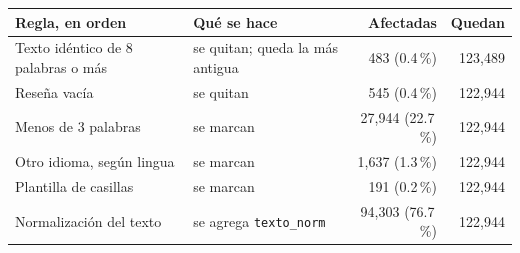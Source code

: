\begin{tabularx}{\textwidth}{>{\raggedright\arraybackslash}X >{\raggedright\arraybackslash}p{4.4cm} rr}
\toprule
Regla, en orden & Qué se hace & Afectadas & Quedan \\
\midrule
Texto idéntico de 8 palabras o más & se quitan; queda la más antigua & 483 (0.4\,\%) & 123,489 \\
Reseña vacía & se quitan & 545 (0.4\,\%) & 122,944 \\
Menos de 3 palabras & se marcan & 27,944 (22.7\,\%) & 122,944 \\
Otro idioma, según lingua & se marcan & 1,637 (1.3\,\%) & 122,944 \\
Plantilla de casillas & se marcan & 191 (0.2\,\%) & 122,944 \\
Normalización del texto & se agrega \texttt{texto\_norm} & 94,303 (76.7\,\%) & 122,944 \\
\bottomrule
\end{tabularx}
